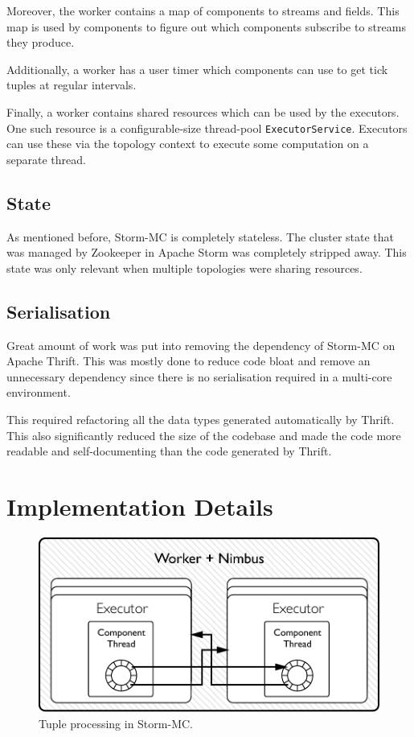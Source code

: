 Moreover, the worker contains a map of components to streams and fields. This map is used by components to figure out which components subscribe to streams they produce.

Additionally, a worker has a user timer which components can use to get tick tuples at regular intervals.

Finally, a worker contains shared resources which can be used by the executors. One such resource is a configurable-size thread-pool \texttt{ExecutorService}. Executors can use these via the topology context to execute some computation on a separate thread.


\subsection{State}

As mentioned before, Storm-MC is completely stateless. The cluster state that was managed by Zookeeper in Apache Storm was completely stripped away. This state was only relevant when multiple topologies were sharing resources.

\subsection{Serialisation}

Great amount of work was put into removing the dependency of Storm-MC on Apache Thrift. This was mostly done to reduce code bloat and remove an unnecessary dependency since there is no serialisation required in a multi-core environment.

This required refactoring all the data types generated automatically by Thrift. This also significantly reduced the size of the codebase and made the code more readable and self-documenting than the code generated by Thrift.

\section{Implementation Details}

\begin{figure}[!htb]
	\centering
	\includegraphics[scale=0.7]{pdf/worker_inside_mc.pdf}
	\caption{Tuple processing in Storm-MC.}
	\label{fig:worker_inside_mc}
\end{figure}

